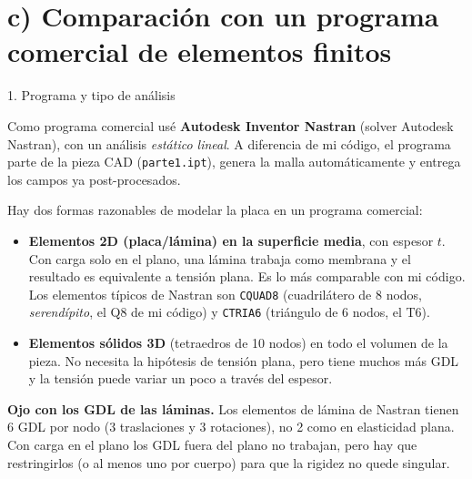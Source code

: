 \newpage
\section*{c) Comparaci\'on con un programa comercial de elementos finitos}

\begin{desarrollo}{1. Programa y tipo de an\'alisis}

Como programa comercial us\'e \textbf{Autodesk Inventor Nastran} (solver
Autodesk Nastran), con un an\'alisis \emph{est\'atico lineal}. A diferencia de
mi c\'odigo, el programa parte de la pieza CAD (\texttt{parte1.ipt}), genera la
malla autom\'aticamente y entrega los campos ya post-procesados.

Hay dos formas razonables de modelar la placa en un programa comercial:
\begin{itemize}[itemsep=3pt]
  \item \textbf{Elementos 2D (placa/l\'amina) en la superficie media}, con
  espesor $t$. Con carga solo en el plano, una l\'amina trabaja como membrana y
  el resultado es equivalente a tensi\'on plana. Es lo m\'as comparable con mi
  c\'odigo. Los elementos t\'ipicos de Nastran son \texttt{CQUAD8} (cuadril\'atero
  de 8 nodos, \emph{serend\'ipito}, el Q8 de mi c\'odigo) y \texttt{CTRIA6}
  (tri\'angulo de 6 nodos, el T6).
  \item \textbf{Elementos s\'olidos 3D} (tetraedros de 10 nodos) en todo el
  volumen de la pieza. No necesita la hip\'otesis de tensi\'on plana, pero tiene
  muchos m\'as GDL y la tensi\'on puede variar un poco a trav\'es del espesor.
\end{itemize}

\textbf{Ojo con los GDL de las l\'aminas.} Los elementos de l\'amina de Nastran
tienen 6 GDL por nodo (3 traslaciones y 3 rotaciones), no 2 como en elasticidad
plana. Con carga en el plano los GDL fuera del plano no trabajan, pero hay que
restringirlos (o al menos uno por cuerpo) para que la rigidez no quede singular.
\end{desarrollo}

